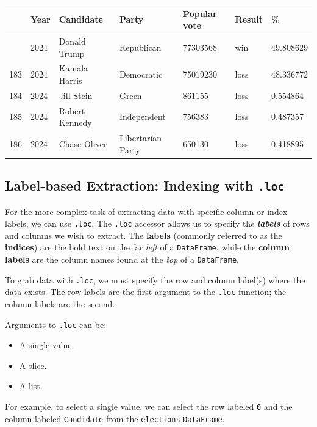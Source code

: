 \documentclass[
  letterpaper,
  DIV=11,
  numbers=noendperiod]{scrreprt}
\providecommand{\tightlist}{%
  \setlength{\itemsep}{0pt}\setlength{\parskip}{0pt}}\usepackage{longtable,booktabs,array}
\begin{document}
\begin{longtable}[]{@{}lllllll@{}}
\toprule\noalign{}
& Year & Candidate & Party & Popular vote & Result & \% \\
\midrule\noalign{}
\endhead
\bottomrule\noalign{}
\endlastfoot
182 & 2024 & Donald Trump & Republican & 77303568 & win & 49.808629 \\
183 & 2024 & Kamala Harris & Democratic & 75019230 & loss & 48.336772 \\
184 & 2024 & Jill Stein & Green & 861155 & loss & 0.554864 \\
185 & 2024 & Robert Kennedy & Independent & 756383 & loss & 0.487357 \\
186 & 2024 & Chase Oliver & Libertarian Party & 650130 & loss &
0.418895 \\
\end{longtable}

\subsection{\texorpdfstring{Label-based Extraction: Indexing with
\texttt{.loc}}{Label-based Extraction: Indexing with .loc}}\label{label-based-extraction-indexing-with-.loc}

For the more complex task of extracting data with specific column or
index labels, we can use \texttt{.loc}. The \texttt{.loc} accessor
allows us to specify the \textbf{\emph{labels}} of rows and columns we
wish to extract. The \textbf{labels} (commonly referred to as the
\textbf{indices}) are the bold text on the far \emph{left} of a
\texttt{DataFrame}, while the \textbf{column labels} are the column
names found at the \emph{top} of a \texttt{DataFrame}.

To grab data with \texttt{.loc}, we must specify the row and column
label(s) where the data exists. The row labels are the first argument to
the \texttt{.loc} function; the column labels are the second.

Arguments to \texttt{.loc} can be:

\begin{itemize}
\tightlist
\item
  A single value.
\item
  A slice.
\item
  A list.
\end{itemize}

For example, to select a single value, we can select the row labeled
\texttt{0} and the column labeled \texttt{Candidate} from the
\texttt{elections} \texttt{DataFrame}.
\end{document}
